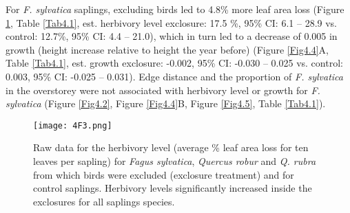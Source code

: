 \documentclass[b5paper,10pt]{book} %
\begin{document}
	For \textit{F. sylvatica} saplings, excluding birds led to 4.8\% more leaf area loss (Figure \ref{Fig4.3}, Table \ref{Tab4.1}, est. herbivory level exclosure: 17.5 \%, 95\% CI: 6.1 -- 28.9 vs. control: 12.7\%, 95\% CI: 4.4 -- 21.0), which in turn led to a decrease of 0.005 in growth (height increase relative to height the year before) (Figure \ref{Fig4.4}A, Table \ref{Tab4.1}, est. growth exclosure: -0.002, 95\% CI: -0.030 -- 0.025 vs. control: 0.003, 95\% CI: -0.025 -- 0.031). Edge distance and the proportion of \textit{F. sylvatica} in the overstorey were not associated with herbivory level or growth for \textit{F. sylvatica} (Figure \ref{Fig4.2}, Figure \ref{Fig4.4}B, Figure \ref{Fig4.5}, Table \ref{Tab4.1}). 

	\begin{figure}
		\begin{center}
			\texttt{[image: 4F3.png]}
		\end{center}
			\caption{Raw data for the herbivory level (average \% leaf area loss for ten leaves per sapling) for \textit{Fagus sylvatica}, \textit{Quercus robur} and \textit{Q. rubra} from which birds were excluded (exclosure treatment) and for control saplings. Herbivory levels significantly increased inside the exclosures for all saplings species. \label{Fig4.3}}
	\end{figure}
\end{document}
